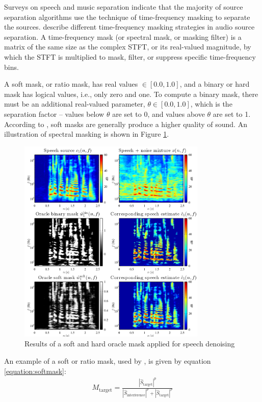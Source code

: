 \documentclass[report.tex]{subfiles}
\begin{document}
Surveys on speech \parencite{speechmask} and music separation \parencite{musicmask} indicate that the majority of source separation algorithms use the technique of time-frequency masking to separate the sources.  \textcite{masking} describe different time-frequency masking strategies in audio source separation. A time-frequency mask (or spectral mask, or masking filter) is a matrix of the same size as the complex STFT, or its real-valued magnitude, by which the STFT is multiplied to mask, filter, or suppress specific time-frequency bins.

A soft mask, or ratio mask, has real values $\in [0.0, 1.0]$, and a binary or hard mask has logical values, i.e., only zero and one. To compute a binary mask, there must be an additional real-valued parameter, $\theta \in [0.0, 1.0]$, which is the separation factor -- values below $\theta$ are set to 0, and values above $\theta$ are set to 1. According to \textcite{masking}, soft masks are generally produce a higher quality of sound. An illustration of spectral masking is shown in Figure \ref{fig:masks}.

\begin{figure}[ht]
	\centering
	\includegraphics[width=0.8\textwidth]{./images-mss/maskdemo.png}
	\caption{Results of a soft and hard oracle mask applied for speech denoising \parencite[71]{masking}}
	\label{fig:masks}
\end{figure}

An example of a soft or ratio mask, used by \textcite{fitzgerald1, fitzgerald2}, is given by equation \eqref{equation:softmask}:
\begin{align}
	M_{\text{target}} = \frac{|\hat{S}_{\text{target}}|^{p}}{|\hat{S}_{\text{interference}}|^{p} + |\hat{S}_{\text{target}}|^{p}}\tag{16}\label{equation:softmask}
\end{align}
\end{document}
